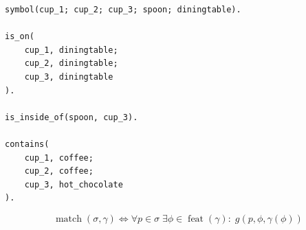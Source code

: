 \begin{lstlisting}[float,caption={Eine symbolische Beschreibung der Objekte in bla.},label=lst:cups_symbolic]
symbol(cup_1; cup_2; cup_3; spoon; diningtable).

is_on(
    cup_1, diningtable;
    cup_2, diningtable;
    cup_3, diningtable
).

is_inside_of(spoon, cup_3).

contains(
    cup_1, coffee;
    cup_2, coffee;
    cup_3, hot_chocolate
).

\end{lstlisting}



%
%




$$\operatorname{match}(\sigma, \gamma) \Leftrightarrow \forall p \in \sigma \; \exists \phi \in \operatorname{feat}(\gamma): \; g(p, \phi, \gamma(\phi))$$


